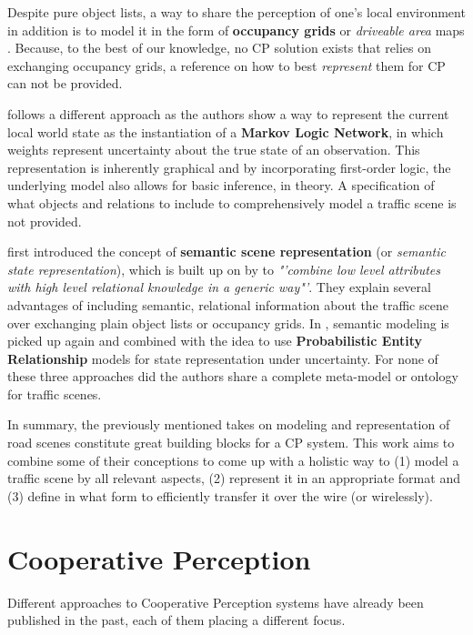 Despite pure object lists, a way to share the perception of one's local environment in addition is to model it in the form of \textbf{occupancy grids} or \textit{driveable area} maps \cite{pieringermodellierung}. Because, to the best of our knowledge, no CP solution exists that relies on exchanging occupancy grids, a reference on how to best \textit{represent} them for CP can not be provided.

\cite{Stiller2012} follows a different approach as the authors show a way to represent the current local world state as the instantiation of a \textbf{Markov Logic Network}, in which weights represent uncertainty about the true state of an observation. This representation is inherently graphical and by incorporating first-order logic, the underlying model also allows for basic inference, in theory. A specification of what objects and relations to include to comprehensively model a traffic scene is not provided.

\cite{Kohlhaas2014} first introduced the concept of \textbf{semantic scene representation} (or \textit{semantic state representation}), which is built up on by \cite{Wolf2018} to \textit{"'combine low level attributes with high level relational knowledge in a generic way"'}. They explain several advantages of including semantic, relational information about the traffic scene over exchanging plain object lists or occupancy grids. In \cite{Petrich2018}, semantic modeling is picked up again and combined with the idea to use \textbf{Probabilistic Entity Relationship} models for state representation under uncertainty. For none of these three approaches did the authors share a complete meta-model or ontology for traffic scenes.
\par
\bigskip

In summary, the previously mentioned takes on modeling and representation of road scenes constitute great building blocks for a CP system. This work aims to combine some of their conceptions to come up with a holistic way to (1) model a traffic scene by all relevant aspects, (2) represent it in an appropriate format and (3) define in what form to efficiently transfer it over the wire (or wirelessly). 

\section{Cooperative Perception}
\label{sec:related_work:cooperative_perception}
Different approaches to Cooperative Perception systems have already been published in the past, each of them placing a different focus.
\par
\bigskip

